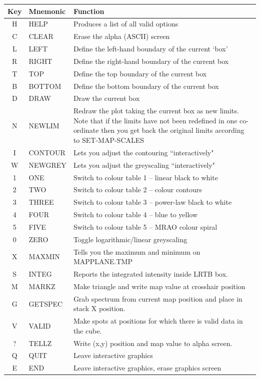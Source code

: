\documentclass[11pt,twoside]{report}
\begin{document}
\begin{table}[htbp]
\begin{center}
\begin{tabular}{|c|l|l|} \hline
Key & Mnemonic & Function \\ \hline
H &HELP &Produces a list of all valid options\\
C &CLEAR &Erase the alpha (ASCII) screen\\
L &LEFT &Define the left-hand boundary of the current `box'\\
R &RIGHT &Define the right-hand boundary of the current box\\
T &TOP &Define the top boundary of the current box\\
B &BOTTOM &Define the bottom boundary of the current box\\
D &DRAW &Draw the current box\\
N & NEWLIM & \parbox[t]{3.7in}{ Redraw the plot taking the current box as new
                      limits. Note that if the limits have not been
                      redefined in one co-ordinate then you get back the
                      original limits according to SET-MAP-SCALES} \\
I & CONTOUR & Lets you adjust the contouring ``interactively"\\
W & NEWGREY & Lets you adjust the greyscaling ``interactively"\\
1 & ONE     & Switch to colour table 1 -- linear black to white\\
2 & TWO     & Switch to colour table 2 -- colour contours\\
3 & THREE   & Switch to colour table 3 -- power-law black to white\\
4 & FOUR    & Switch to colour table 4 -- blue to yellow\\
5 & FIVE    & Switch to colour table 5 -- MRAO colour spiral\\
0 & ZERO    & Toggle logarithmic/linear greyscaling\\
X & MAXMIN & Tells you the maximum and minimum on MAPPLANE.TMP\\
S & INTEG & Reports the integrated intensity inside LRTB box.\\
M & MARKZ & Make triangle and write map value at crosshair position\\
G & GETSPEC & \parbox[t]{3.7in}{Grab spectrum from current map position and place in
                      stack X position.}\\
V & VALID & \parbox[t]{3.7in}{Make spots at positions for which there is valid
                    data in the cube.}\\
? & TELLZ & Write (x,y) position and map value to alpha screen.\\
Q & QUIT & Leave interactive graphics\\
E &END &Leave interactive graphics, erase graphics screen\\ \hline
\end{tabular}
\end{center}
\end{table}
\end{document}
